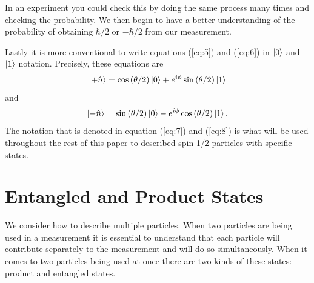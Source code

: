 \documentclass[twocolumn]{article}
\begin{document}
In an experiment you could check this by doing the same process many times and checking the probability. We then begin to have a better understanding of the probability of obtaining $\hbar/2$ or $-\hbar/2$ from our measurement.

Lastly it is more conventional to write equations (\ref{eq:5}) and (\ref{eq:6}) in $\ket{0}$ and $\ket{1}$ notation. Precisely, these equations are
\begin{equation} \label{eq:7}
\ket{+\hat{n}}=\cos{(\theta/2)}\ket{0}+e^{i\phi}\sin{(\theta/2)}\ket{1}
\end{equation}
and
\begin{equation} \label{eq:8}
\ket{-\hat{n}}=\sin{(\theta/2)}\ket{0}-e^{i\phi}\cos{(\theta/2)}\ket{1}.
\end{equation}
The notation that is denoted in equation (\ref{eq:7}) and (\ref{eq:8}) is what will be used throughout the rest of this paper to described spin-1/2 particles with specific states.
\section*{Entangled and Product States}
We consider how to describe multiple particles. When two particles are being used in a measurement it is essential to understand that each particle will contribute separately to the measurement and will do so simultaneously. When it comes to two particles being used at once there are two kinds of these states: product and entangled states.
\end{document}
